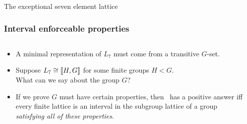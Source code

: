 \begin{frame}[fragile,label=Conclusion,shrink=5]{The exceptional seven element lattice}
  \frametitle{Interval enforceable properties}
  \begin{columns}
    \begin{column}{0.7\textwidth}
      \begin{itemize}
      \item<1-> A minimal representation of $L_7$ must come from a transitive $G$-set.
        \vskip2mm
      \item<2-> Suppose $L_7 \cong \llbracket H, G \rrbracket$ for some finite groups $H<G$.\\[4pt]
        What can we say about the group $G$?
        \vskip2mm
      \item<3-> If we prove $G$ must have certain properties, then \FLRP\ has a
        positive answer iff every finite lattice is an interval
        in the subgroup lattice of a group \emph{satisfying all of these properties}.
      \end{itemize}
    \end{column}
    \begin{column}{0.2\textwidth}
      \begin{center}
      \end{center}
    \end{column}
  \end{columns}


\end{frame}
